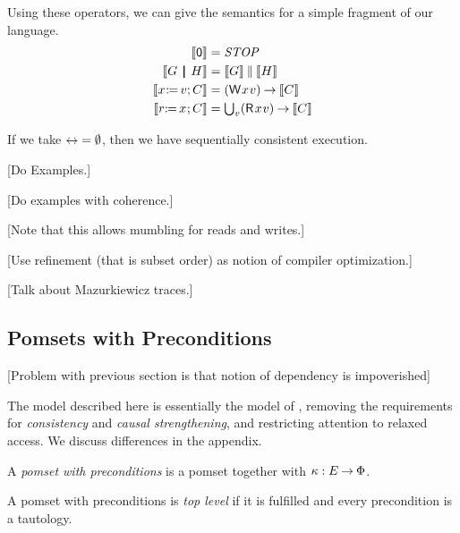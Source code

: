 Using these operators, we can give the semantics for a simple fragment of our
language.
\begin{align*}
  \sem{\NIL} &= \sSTOP
  \\
  \sem{\aGrp \PAR \bGrp} &= \sem{\aGrp}\sPAR\sem{\bGrp}
  \\
  \sem{\PW{\aLoc}{\aVal}\SEMI \aCmd} &= \textstyle\DWP{\aLoc}{\aVal}\sPREFIX\sem{\aCmd}
  \\
  \sem{\PR{\aLoc}{\aReg}\SEMI \aCmd} &= \textstyle\bigcup_{\aVal}\DRP{\aLoc}{\aVal}\sPREFIX\sem{\aCmd}
\end{align*}

If we take ${\mathrel\leftrightarrow} = \emptyset$, then we have sequentially consistent
execution.

[Do Examples.]

[Do examples with coherence.]

[Note that this allows mumbling for reads and writes.]

[Use refinement (that is subset order) as notion of compiler optimization.]

[Talk about Mazurkiewicz traces.]

\subsection{Pomsets with Preconditions}

[Problem with previous section is that notion of dependency is impoverished]

The model described here is essentially the model of
\cite{DBLP:journals/pacmpl/JagadeesanJR20}, removing the requirements for
\emph{consistency} and \emph{causal strengthening}, and restricting attention
to relaxed access.  We discuss differences in the appendix.

\begin{definition}
  A \emph{pomset with preconditions} is
  a pomset together with $\kappa:E\mathbin\rightarrow\Phi$.
\end{definition}

\begin{definition}
  A pomset with preconditions is \emph{top level} if it is fulfilled and
  every precondition is a tautology.
\end{definition}

